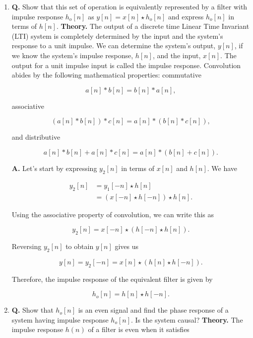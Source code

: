 \documentclass[main.tex]{subfiles}
\begin{document}
\begin{enumerate}
    \begin{enumerate}
        \item \textbf{Q.} Show that this set of operation is equivalently represented by a filter with impulse response $h_{o}[n]$ as $y[n]=x[n] \star h_{o}[n]$ and express $h_{o}[n]$ in terms of $h[n]$. \textbf{Theory.} The output of a discrete time Linear Time Invariant (LTI) system is completely determined by the input and the system's response to a unit impulse. We can determine the system's output, $y[n]$, if we know the system's impulse response, $h[n]$, and the input, $x[n]$. The output for a unit impulse input is called the impulse response. Convolution abides by the following mathematical properties: commutative 
        
        $$
        a[n] * b[n]=b[n] * a[n],
        $$ 
        
        associative 
        
        $$
        (a[n] * b[n]) * c[n]=a[n] *(b[n] * c[n]),
        $$
        
        and distributive 
        
        $$
        a[n] * b[n]+a[n] * c[n]=a[n] *(b[n]+c[n]).
        $$
        
        \textbf{A.} Let's start by expressing $y_2[n]$ in terms of $x[n]$ and $h[n]$. We have
        
        $$
        \begin{aligned}
        y_2[n]&=y_1[-n] \star h[n] \\
        &=(x[-n] \star h[-n]) \star h[n] .
        \end{aligned}
        $$
        
        Using the associative property of convolution, we can write this as 
        
        $$
        y_2[n]=x[-n] \star(h[-n] \star h[n]).
        $$
        
        Reversing $y_2[n]$ to obtain $y[n]$ gives us 
        
        $$
        y[n]=y_2[-n]=x[n] \star(h[n] \star h[-n]).
        $$
        
        Therefore, the impulse response of the equivalent filter is given by 
        
        $$
        h_o[n]=h[n] \star h[-n].
        $$
        
        \item \textbf{Q.} Show that $h_{o}[n]$ is an even signal and find the phase response of a system having impulse response $h_{o}[n]$. Is the system causal? \textbf{Theory.} The impulse response $h(n)$ of a filter is even when it satisfies 
        

\end{enumerate}
\end{enumerate}
\end{document}

